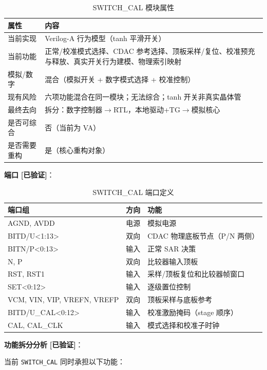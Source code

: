\documentclass[UTF8,a4paper,11pt]{ctexart}
\newcommand{\verified}{\textcolor{verifiedgreen}{\textbf{[已验证]}}}
\begin{document}
\begin{table}[H]
\centering
\caption{SWITCH\_CAL 模块属性}
\label{tab:sw-attr}
\begin{tabular}{ll}
\toprule
属性 & 内容 \\
\midrule
当前实现   & Verilog-A 行为模型（tanh 平滑开关） \\
当前功能   & 正常/校准模式选择、CDAC 参考选择、顶板采样/复位、校准预充与释放、真实开关行为建模、物理索引映射 \\
模拟/数字  & 混合（模拟开关 + 数字模式选择 + 校准控制） \\
现有风险   & 六项功能混合在同一模块；无法综合；tanh 开关非真实晶体管 \\
最终去向   & 拆分：数字控制器$\rightarrow$RTL，本地驱动+TG$\rightarrow$模拟核心 \\
是否可综合 & 否（当前为 VA） \\
是否需要重构 & 是（核心重构对象） \\
\bottomrule
\end{tabular}
\end{table}

\textbf{端口} \verified：

\begin{table}[H]
\centering
\caption{SWITCH\_CAL 端口定义}
\label{tab:sw-ports}
\begin{tabular}{lll}
\toprule
端口组 & 方向 & 功能 \\
\midrule
AGND, AVDD               & 电源 & 模拟电源 \\
BITD/U<1:13>             & 双向 & CDAC 物理底板节点（P/N 两侧） \\
BITN/P<0:13>             & 输入 & 正常 SAR 决策 \\
N, P                     & 双向 & 比较器输入顶板 \\
RST, RST1                & 输入 & 采样/顶板复位和比较器帧窗口 \\
SET<0:12>                & 输入 & 逐级置位控制 \\
VCM, VIN, VIP, VREFN, VREFP & 双向 & 顶板采样与底板参考 \\
BITD/U\_CAL<0:12>        & 输入 & 校准激励掩码（stage 顺序） \\
CAL, CAL\_CLK            & 输入 & 模式选择和校准子时钟 \\
\bottomrule
\end{tabular}
\end{table}

\textbf{功能拆分分析} \verified：

当前 \texttt{SWITCH\_CAL} 同时承担以下功能：
\end{document}

